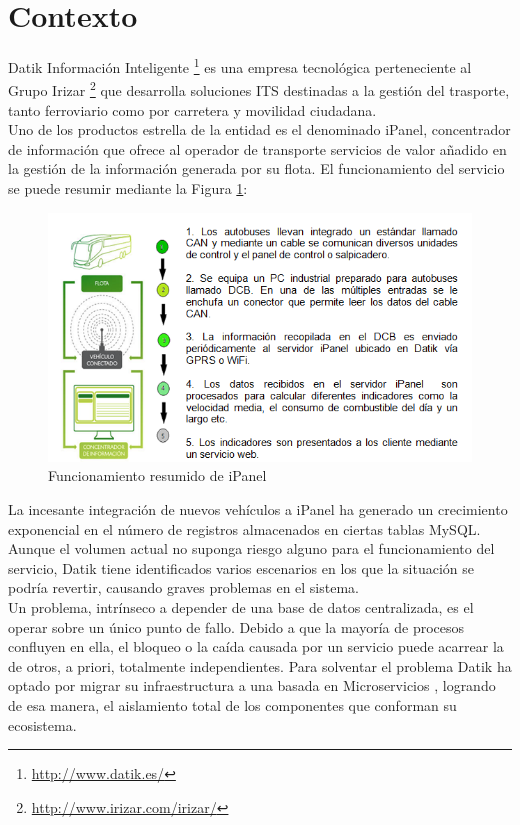 \section{Contexto}
 
Datik Información Inteligente \footnote{\url{http://www.datik.es/}} es una empresa tecnológica perteneciente al Grupo Irizar \footnote{\url{http://www.irizar.com/irizar/}}  que desarrolla soluciones ITS destinadas a la gestión del trasporte, tanto ferroviario como por carretera y movilidad ciudadana.\\

Uno de los productos estrella de la entidad es el denominado iPanel, concentrador de  información que ofrece al operador de transporte servicios de valor añadido en la gestión de la información generada por su flota. El funcionamiento del servicio se puede resumir mediante la Figura \ref{fig:ipanel}:\\

\begin{figure}[h]
	\centering
	\includegraphics[width=1\textwidth]{Ilustraciones/ipanel_infraesctructure.png}
	\caption{Funcionamiento resumido de iPanel}
	\label{fig:ipanel}
\end{figure}

La incesante integración de nuevos vehículos a iPanel ha generado un crecimiento exponencial en el número de registros almacenados en ciertas tablas MySQL. Aunque el volumen actual no suponga riesgo alguno para el funcionamiento del servicio, Datik tiene identificados varios escenarios en los que la situación se podría revertir, causando graves problemas en el sistema.\\

Un problema, intrínseco a depender de una base de datos centralizada, es el operar sobre un único punto de fallo. Debido a que la mayoría de procesos confluyen en ella, el bloqueo o la caída causada por un servicio puede acarrear la de otros, a priori, totalmente independientes. Para solventar el problema Datik ha optado por migrar su infraestructura a una basada en Microservicios \cite{newman2015building}, logrando de esa manera, el aislamiento total de los componentes que conforman su ecosistema.\\ 

